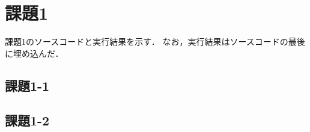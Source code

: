 \section{課題1}
課題1のソースコードと実行結果を示す．
なお，実行結果はソースコードの最後に埋め込んだ．

\subsection{課題1-1}


\subsection{課題1-2}

